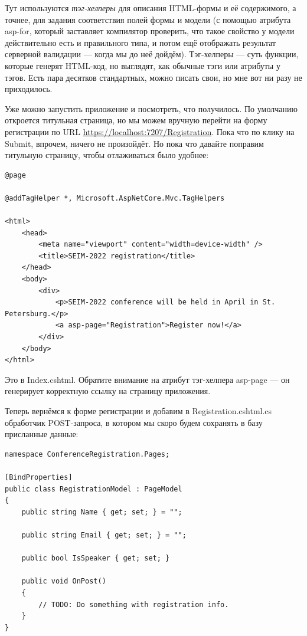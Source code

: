 \documentclass[a5paper]{article}
\begin{document}
Тут используются \emph{тэг-хелперы} для описания HTML-формы и её содержимого, а точнее, для задания соответствия полей формы и модели (с помощью атрибута asp-for, который заставляет компилятор проверить, что такое свойство у модели действительно есть и правильного типа, и потом ещё отображать результат серверной валидации --- когда мы до неё дойдём). Тэг-хелперы --- суть функции, которые генерят HTML-код, но выглядят, как обычные тэги или атрибуты у тэгов. Есть пара десятков стандартных, можно писать свои, но мне вот ни разу не приходилось.

Уже можно запустить приложение и посмотреть, что получилось. По умолчанию откроется титульная страница, но мы можем вручную перейти на форму регистрации по URL \url{https://localhost:7207/Registration}. Пока что по клику на Submit, впрочем, ничего не произойдёт. Но пока что давайте поправим титульную страницу, чтобы отлаживаться было удобнее:

\begin{verbatim}
@page

@addTagHelper *, Microsoft.AspNetCore.Mvc.TagHelpers

<html>
    <head>
        <meta name="viewport" content="width=device-width" />
        <title>SEIM-2022 registration</title>
    </head>
    <body>
        <div>
            <p>SEIM-2022 conference will be held in April in St. Petersburg.</p>
            <a asp-page="Registration">Register now!</a>
        </div>
    </body>
</html>
\end{verbatim}

Это в Index.cshtml. Обратите внимание на атрибут тэг-хелпера asp-page --- он генерирует корректную ссылку на страницу приложения.

Теперь вернёмся к форме регистрации и добавим в Registration.cshtml.cs обработчик POST-запроса, в котором мы скоро будем сохранять в базу присланные данные:

\begin{verbatim}
namespace ConferenceRegistration.Pages;

[BindProperties]
public class RegistrationModel : PageModel
{
    public string Name { get; set; } = "";

    public string Email { get; set; } = "";

    public bool IsSpeaker { get; set; }

    public void OnPost()
    {
        // TODO: Do something with registration info.
    }
}
\end{verbatim}
\end{document}
